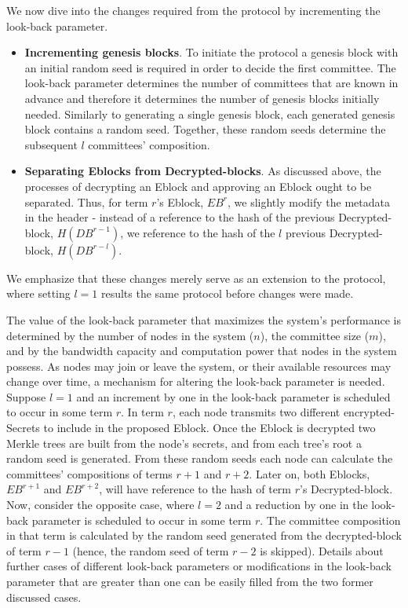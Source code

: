 We now dive into the changes required from the protocol by incrementing the look-back parameter.

\begin{itemize}
\item \textbf{Incrementing genesis blocks}. To initiate the protocol a genesis block with an initial random seed is required in order to decide the first committee. The look-back parameter determines the number of committees that are known in advance and therefore it determines the number of genesis blocks initially needed. Similarly to generating a single genesis block, each generated genesis block contains a random seed. Together, these random seeds determine the subsequent $l$ committees’ composition.

\item \textbf{Separating Eblocks from Decrypted-blocks}. As discussed above, the processes of decrypting an Eblock and approving an Eblock ought to be separated. Thus, for term $r$’s Eblock, $EB^r$, we slightly modify the metadata in the header - instead of a reference to the hash of the previous Decrypted-block, $H(DB^{r-1})$, we reference to the hash of the $l$ previous Decrypted-block, $H(DB^{r-l})$.
\end{itemize}


\noindent We emphasize that these changes merely serve as an extension to the protocol, where setting $l=1$ results the same protocol before changes were made.

The value of the look-back parameter that maximizes the system’s performance is determined by the number of nodes in the system ($n$), the committee size ($m$), and by the bandwidth capacity and computation power that nodes in the system possess. As nodes may join or leave the system, or their available resources may change over time, a mechanism for altering the look-back parameter is needed.
Suppose $l=1$ and an increment by one in the look-back parameter is scheduled to occur in some term $r$. In term $r$, each node transmits two different encrypted-Secrets to include in the proposed Eblock. Once the Eblock is decrypted two Merkle trees are built from the node’s secrets, and from each tree’s root a random seed is generated. From these random seeds each node can calculate the committees’ compositions of terms $r+1$ and $r+2$. Later on, both Eblocks, $EB^{r+1}$ and $EB^{r+2}$, will have reference to the hash of term $r$’s Decrypted-block.
Now, consider the opposite case, where $l=2$ and a reduction by one in the look-back parameter is scheduled to occur in some term $r$. The committee composition in that term is calculated by the random seed generated from the decrypted-block of term $r-1$ (hence, the random seed of term $r-2$ is skipped).
Details about further cases of different look-back parameters or modifications in the look-back parameter that are greater than one can be easily filled from the two former discussed cases.
